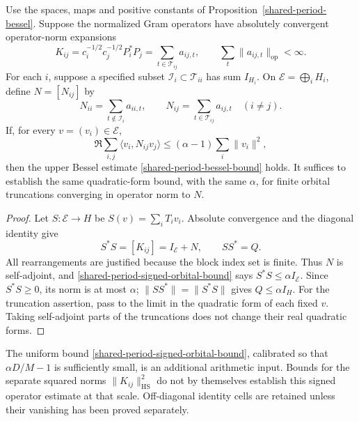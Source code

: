 \begin{proposition}\label{shared-period-block-gram}
Use the spaces, maps and positive constants of
Proposition~\ref{shared-period-bessel}. Suppose the normalized Gram
operators have absolutely convergent operator-norm expansions
\[
 K_{ij}=c_i^{-1/2}c_j^{-1/2}P_i^*P_j
       =\sum_{t\in\mathcal T_{ij}}a_{ij,t},
 \qquad \sum_t\|a_{ij,t}\|_{\mathrm{op}}<\infty.
\]
For each \(i\), suppose a specified subset
\(\mathcal I_i\subset\mathcal T_{ii}\) has sum \(I_{H_i}\).
On \(\mathcal E=\bigoplus_iH_i\), define \(N=[N_{ij}]\) by
\[
 N_{ii}=\sum_{t\notin\mathcal I_i}a_{ii,t},
 \qquad N_{ij}=\sum_{t\in\mathcal T_{ij}}a_{ij,t}\quad(i\ne j).
\]
If, for every \(v=(v_i)\in\mathcal E\),
\begin{equation}\label{shared-period-signed-orbital-bound}
 \Re\sum_{i,j}\langle v_i,N_{ij}v_j\rangle
       \le(\alpha-1)\sum_i\|v_i\|^2,
\end{equation}
then the upper Bessel estimate
\eqref{shared-period-bessel-bound} holds.
It suffices to establish the same quadratic-form bound, with the same
\(\alpha\), for finite orbital truncations converging in operator norm
to \(N\).
\end{proposition}

\begin{proof}
Let \(S:\mathcal E\to H\) be \(S(v)=\sum_iT_iv_i\).
Absolute convergence and the diagonal identity give
\[
 S^*S=[K_{ij}]=I_{\mathcal E}+N,\qquad SS^*=Q.
\]
All rearrangements are justified because the block index set is finite.
Thus \(N\) is self-adjoint, and
\eqref{shared-period-signed-orbital-bound} says
\(S^*S\le\alpha I_{\mathcal E}\).
Since \(S^*S\ge0\), its norm is at most \(\alpha\);
\(\|SS^*\|=\|S^*S\|\) gives \(Q\le\alpha I_H\).
For the truncation assertion, pass to the limit in the quadratic form
of each fixed \(v\). Taking self-adjoint parts of the truncations
does not change their real quadratic forms.
\end{proof}

The uniform bound \eqref{shared-period-signed-orbital-bound}, calibrated
so that \(\alpha D/M-1\) is sufficiently small, is an additional
arithmetic input. Bounds for the separate squared norms
\(\|K_{ij}\|_{\mathrm{HS}}^2\) do not by themselves establish this
signed operator estimate at that scale. Off-diagonal identity cells
are retained unless their vanishing has been proved separately.
